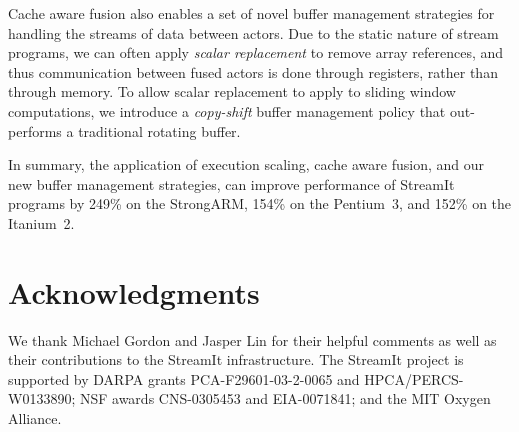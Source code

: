 \documentclass{sigplanconf}
\begin{document}
Cache aware fusion also enables a set of novel buffer management
strategies for handling the streams of data between actors. Due to the
static nature of stream programs, we can often apply {\it scalar
  replacement} to remove array references, and thus communication
between fused actors is done through registers, rather than through
memory.  To allow scalar replacement to apply to sliding window 
computations, we introduce a {\it copy-shift} buffer management policy
that out-performs a traditional rotating buffer.

In summary, the application of execution scaling, cache aware fusion, and our
new buffer management strategies, can improve performance of
StreamIt programs by 249\% on the StrongARM, 154\% on the Pentium~3,
and 152\% on the Itanium~2.


\section{Acknowledgments}
We thank Michael Gordon and Jasper Lin for their helpful comments as 
well as their contributions to the StreamIt infrastructure.
The StreamIt project is
supported by DARPA grants PCA-F29601-03-2-0065 and
HPCA/PERCS-W0133890; NSF awards CNS-0305453 and EIA-0071841; and the
MIT Oxygen Alliance.
\end{document}

